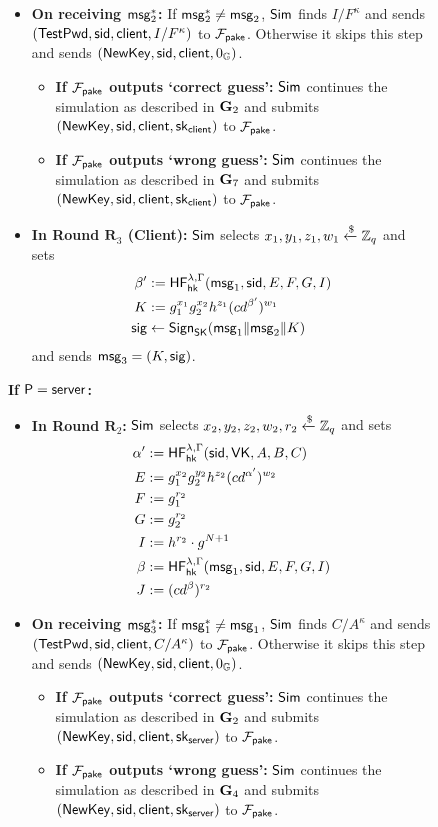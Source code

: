 \begin{figure}[tbp]
\begin{framed}
\begin{itemize}
			\item \textbf{On receiving $\mathsf{msg}_{2}^{*}$:} If $\mathsf{msg}_{2}^{*}\neq\mathsf{msg}_{2}$, $\mathsf{Sim}$ finds $I/F^\kappa$ and sends $(\mathsf{TestPwd},\mathsf{sid},\mathsf{client},I/F^\kappa)$ to $\mathcal{F}_{\mathsf{pake}}$. Otherwise it skips this step and sends $(\mathsf{NewKey},\mathsf{sid}, \mathsf{client},0_{\mathbb{G}})$.
			\begin{itemize}
				\item \textbf{If $\mathcal{F}_{\mathsf{pake}}$ outputs `correct guess':} $\mathsf{Sim}$ continues the simulation as described in $\mathbf{G}_2$ and submits $(\mathsf{NewKey},\mathsf{sid}, \mathsf{client},\mathsf{sk}_{\mathsf{client}})$ to $\mathcal{F}_{\mathsf{pake}}$.
				\item \textbf{If $\mathcal{F}_{\mathsf{pake}}$ outputs `wrong guess':} $\mathsf{Sim}$ continues the simulation as described in $\mathbf{G}_7$ and submits $(\mathsf{NewKey},\mathsf{sid}, \mathsf{client},\mathsf{sk}_{\mathsf{client}})$ to $\mathcal{F}_{\mathsf{pake}}$.
			\end{itemize}
			\item\textbf{In Round $\mathbf{R}_3$ (Client):} $\mathsf{Sim}$ selects $x_1,y_1,z_1,w_1\xleftarrow{\$}\mathbb{Z}_q$ and sets
			\begin{align*}
				\beta' &:= \mathsf{HF}_{\mathsf{hk}}^{\lambda,\Gamma}(\mathsf{msg}_{1},\mathsf{sid},E,F,G,I)\\
				K &:= g_1^{x_1}g_2^{x_2}h^{z_1}(cd^{\beta'})^{w_1}\\
				\mathsf{sig} &\gets\mathsf{Sign}_{\mathsf{SK}}(\mathsf{msg}_{1}\|\mathsf{msg}_{2}\|K)
			\end{align*}
			and sends $\mathsf{msg}_{3} = (K,\mathsf{sig})$.
		\end{itemize}
	
	\textbf{If $\mathsf{P}=\mathsf{server}$:}
		\begin{itemize}
			\item \textbf{In Round $\mathbf{R}_2$:} $\mathsf{Sim}$ selects $x_2,y_2,z_2,w_2,r_2\xleftarrow{\$}\mathbb{Z}_q$ and sets
			\begin{align*}
				\alpha' &:= \mathsf{HF}_{\mathsf{hk}}^{\lambda,\Gamma}(\mathsf{sid},\mathsf{VK},A,B,C)\\
				E &:= g_1^{x_2}g_2^{y_2}h^{z_2}(cd^{\alpha'})^{w_2}\\
				F &:= g_1^{r_2}\\
				G &:= g_2^{r_2}\\
				I &:= h^{r_2}\cdot g^{N+1}\\
				\beta &:= \mathsf{HF}_{\mathsf{hk}}^{\lambda,\Gamma}(\mathsf{msg}_{1},\mathsf{sid},E,F,G,I)\\
				J &:= (cd^{\beta})^{r_2}
			\end{align*}
		\item \textbf{On receiving $\mathsf{msg}_{3}^{*}$:} If $\mathsf{msg}_{1}^{*}\neq\mathsf{msg}_{1}$, $\mathsf{Sim}$ finds $C/A^\kappa$ and sends $(\mathsf{TestPwd},\mathsf{sid},\mathsf{client},C/A^\kappa)$ to $\mathcal{F}_{\mathsf{pake}}$. Otherwise it skips this step and sends $(\mathsf{NewKey},\mathsf{sid},\mathsf{client},0_{\mathbb{G}})$. 
		\begin{itemize}
			\item \textbf{If $\mathcal{F}_{\mathsf{pake}}$ outputs `correct guess':} $\mathsf{Sim}$ continues the simulation as described in $\mathbf{G}_2$ and submits $(\mathsf{NewKey},\mathsf{sid}, \mathsf{client},\mathsf{sk}_{\mathsf{server}})$ to $\mathcal{F}_{\mathsf{pake}}$.
			\item \textbf{If $\mathcal{F}_{\mathsf{pake}}$ outputs `wrong guess':} $\mathsf{Sim}$ continues the simulation as described in $\mathbf{G}_4$ and submits $(\mathsf{NewKey},\mathsf{sid}, \mathsf{client},\mathsf{sk}_{\mathsf{server}})$ to $\mathcal{F}_{\mathsf{pake}}$.
		\end{itemize}
		\end{itemize}


\end{framed}
\end{figure}
